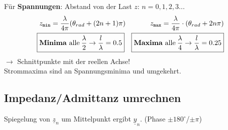 Für \textbf{Spannungen}: Abstand von der Last $ z $: \quad $ n=0,1,2,3... $
\begin{align*}
	                                                                                    & z_{\texttt{min}} = \frac{\lambda}{4\pi}(\theta_{rad}+(2n+1)\pi)                             &
	z_{\texttt{max}} = \frac{\lambda}{4\pi} \cdot (\theta_{rad}+2n\pi)                  &                                                                                               \\
	\Aboxed{                                                                            & \text{\textbf{Minima} alle}\: \frac{\lambda}{2} \rightarrow \frac{l}{\lambda}=0.5} \Aboxed{ &
	\text{\textbf{Maxima} alle}\: \frac{\lambda}{4} \rightarrow \frac{l}{\lambda}=0.25} &
\end{align*}
$ \rightarrow $ Schnittpunkte mit der reellen Achse!\\
Strommaxima sind an Spannungsminima und umgekehrt.

\subsection{Impedanz/Admittanz umrechnen}
Spiegelung von $ \underline{z}_n $ um Mittelpunkt ergibt $ \underline{y}_n $.
(Phase $\pm 180^{\circ}$/$\pm \pi$)

